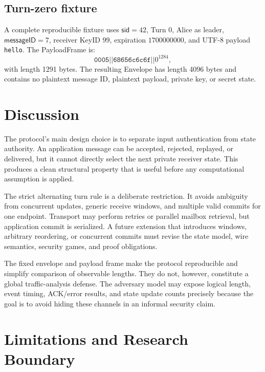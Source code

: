 \documentclass[11pt,letterpaper]{article}
\begin{document}
\subsection{Turn-zero fixture}

A complete reproducible fixture uses $\mathsf{sid}=42$, Turn $0$, Alice as leader,
$\mathsf{messageID}=7$, receiver KeyID $99$, expiration $1700000000$, and UTF-8 payload
\texttt{hello}. The PayloadFrame is:
\[
  \texttt{0005}\mathbin{||}\texttt{68656c6c6f}\mathbin{||}0^{1284},
\]
with length 1291 bytes. The resulting Envelope has length 4096 bytes and contains no
plaintext message ID, plaintext payload, private key, or secret state.

\section{Discussion}
\label{sec:discussion}

The protocol's main design choice is to separate input authentication from state authority.
An application message can be accepted, rejected, replayed, or delivered, but it cannot
directly select the next private receiver state. This produces a clean structural property
that is useful before any computational assumption is applied.

The strict alternating turn rule is a deliberate restriction. It avoids ambiguity from
concurrent updates, generic receive windows, and multiple valid commits for one endpoint.
Transport may perform retries or parallel mailbox retrieval, but application commit is
serialized. A future extension that introduces windows, arbitrary reordering, or concurrent
commits must revise the state model, wire semantics, security games, and proof obligations.

The fixed envelope and payload frame make the protocol reproducible and simplify comparison
of observable lengths. They do not, however, constitute a global traffic-analysis defense.
The adversary model may expose logical length, event timing, ACK/error results, and state
update counts precisely because the goal is to avoid hiding these channels in an informal
security claim.

\section{Limitations and Research Boundary}
\label{sec:limitations}
\end{document}

